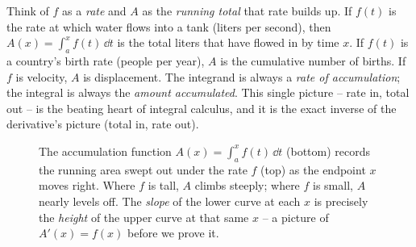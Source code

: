 \begin{happeningbox}
Think of $f$ as a \emph{rate} and $A$ as the \emph{running total} that rate
builds up. If $f(t)$ is the rate at which water flows into a tank (liters per
second), then $A(x)=\int_a^x f(t)\,\dd t$ is the total liters that have flowed in
by time $x$. If $f(t)$ is a country's birth rate (people per year), $A$ is the
cumulative number of births. If $f$ is velocity, $A$ is displacement. The
integrand is always a \emph{rate of accumulation}; the integral is always the
\emph{amount accumulated}. This single picture -- rate in, total out -- is the
beating heart of integral calculus, and it is the exact inverse of the
derivative's picture (total in, rate out).
\end{happeningbox}

\begin{figure}[h]
\centering
{}
\caption{The accumulation function $A(x)=\int_a^x f(t)\,\dd t$ (bottom) records
the running area swept out under the rate $f$ (top) as the endpoint $x$ moves
right. Where $f$ is tall, $A$ climbs steeply; where $f$ is small, $A$ nearly
levels off. The \emph{slope} of the lower curve at each $x$ is precisely the
\emph{height} of the upper curve at that same $x$ -- a picture of
$A'(x)=f(x)$ before we prove it.}
\label{ch20:fig-accumulation}
\end{figure}

